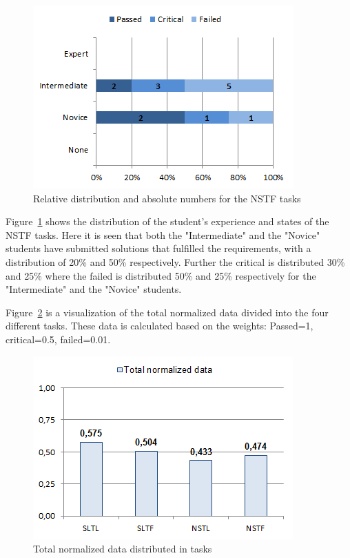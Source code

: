 \documentclass{sig-alternate-05-2015}
\begin{document}
\begin{figure}[!ht]
	\centering
	\includegraphics[width=1\linewidth]{img09}
	\caption{Relative distribution and absolute numbers for the NSTF tasks}
	\label{fig:NSTF percentage distributions with relative task numbers}
\end{figure}

Figure~\ref{fig:NSTF percentage distributions with relative task numbers} shows the distribution of the student's experience and states of the NSTF tasks. Here it is seen that both the "Intermediate" and the "Novice" students have submitted solutions that fulfilled the requirements, with a distribution of 20\% and 50\% respectively. Further the critical is distributed 30\% and 25\% where the failed is distributed 50\% and 25\% respectively for the "Intermediate" and the "Novice" students.

Figure~\ref{fig:Total normalized data distributed in tasks} is a visualization of the total normalized data divided into the four different tasks. These data is calculated based on the weights: Passed=1, critical=0.5, failed=0.01. %

\begin{figure}[!ht]
	\centering
	\includegraphics[width=1\linewidth]{img10}
	\caption{Total normalized data distributed in tasks}
	\label{fig:Total normalized data distributed in tasks}
\end{figure}
\end{document}
